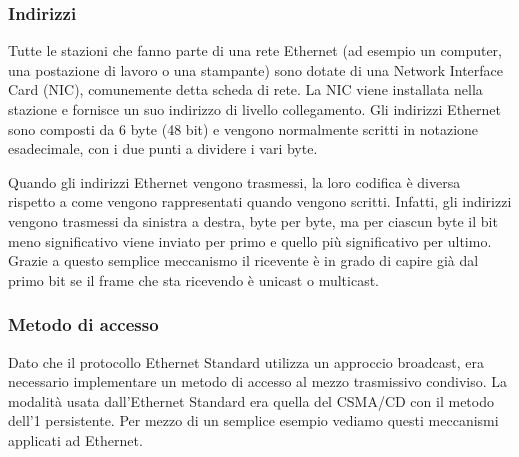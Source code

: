 \subsubsection{Indirizzi}
Tutte le stazioni che fanno parte di una rete Ethernet (ad esempio un computer, una postazione di lavoro o una stampante) sono dotate di una Network Interface Card (NIC), comunemente detta scheda di rete. La NIC viene installata nella stazione e fornisce un suo indirizzo di livello collegamento. Gli indirizzi Ethernet sono composti da 6 byte (48 bit) e vengono normalmente scritti in notazione esadecimale, con i due punti a dividere i vari byte.

Quando gli indirizzi Ethernet vengono trasmessi, la loro codifica è diversa rispetto a come vengono rappresentati quando vengono scritti. Infatti, gli indirizzi vengono trasmessi da sinistra a destra, byte per byte, ma per ciascun byte il bit meno significativo viene inviato per primo e quello più significativo per ultimo. Grazie a questo semplice meccanismo il ricevente è in grado di capire già dal primo bit se il frame che sta ricevendo è unicast o multicast.

\subsubsection{Metodo di accesso}
Dato che il protocollo Ethernet Standard utilizza un approccio broadcast, era necessario implementare un metodo di accesso al mezzo trasmissivo condiviso. La modalità usata dall'Ethernet Standard era quella del CSMA/CD con il metodo dell'1 persistente. Per mezzo di un semplice esempio vediamo questi meccanismi applicati ad Ethernet.

